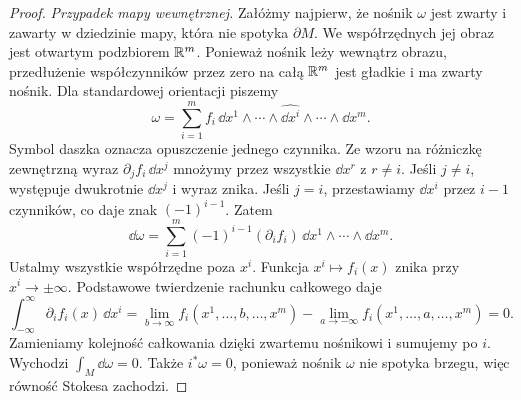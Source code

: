 \begin{proof}
\emph{Przypadek mapy wewnętrznej.}
Załóżmy najpierw, że nośnik $\omega$ jest zwarty
i zawarty w dziedzinie mapy, która nie spotyka
$\partial M$. We współrzędnych jej obraz jest
otwartym podzbiorem $\mathbb{R}^m$. Ponieważ nośnik
leży wewnątrz obrazu, przedłużenie współczynników
przez zero na całą $\mathbb{R}^m$ jest gładkie i ma
zwarty nośnik. Dla standardowej orientacji piszemy
\[
 \omega=\sum_{i=1}^m f_i\,
 \dd x^1\wedge\cdots\wedge\widehat{\dd x^i}
      \wedge\cdots\wedge\dd x^m.
\]
Symbol daszka oznacza opuszczenie jednego czynnika.
Ze wzoru na różniczkę zewnętrzną wyraz
$\partial_j f_i\,\dd x^j$ mnożymy przez wszystkie
$\dd x^r$ z $r\ne i$. Jeśli $j\ne i$, występuje
dwukrotnie $\dd x^j$ i wyraz znika. Jeśli $j=i$,
przestawiamy $\dd x^i$ przez $i-1$ czynników,
co daje znak $(-1)^{i-1}$. Zatem
\[
 \dd\omega=\sum_{i=1}^m(-1)^{i-1}
 (\partial_i f_i)\,\dd x^1\wedge\cdots\wedge\dd x^m.
\]
Ustalmy wszystkie współrzędne poza $x^i$.
Funkcja $x^i\mapsto f_i(x)$ znika przy
$x^i\to\pm\infty$. Podstawowe twierdzenie
rachunku całkowego daje
\[
 \int_{-\infty}^{\infty}\partial_i f_i(x)\,\dd x^i
 =\lim_{b\to\infty}f_i(x^1,\ldots,b,\ldots,x^m)
  -\lim_{a\to-\infty}f_i(x^1,\ldots,a,\ldots,x^m)=0.
\]
Zamieniamy kolejność całkowania dzięki zwartemu
nośnikowi i sumujemy po $i$. Wychodzi
$\int_M\dd\omega=0$. Także
$i^*\omega=0$, ponieważ nośnik $\omega$ nie
spotyka brzegu, więc równość Stokesa zachodzi.


\end{proof}

